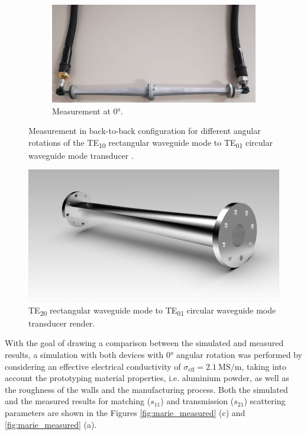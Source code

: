 \documentclass[english,twoside]{article}
\begin{document}
\begin{figure}
    	\begin{subfigure}[b]{0.48\textwidth}
    		\includegraphics[width=\textwidth]{figures/marie_photo_0}
    		\caption{Measurement at $\ang{0}$.}
    	\end{subfigure}
    	\caption{Measurement in back-to-back configuration for different angular rotations of the TE\textsubscript{10} rectangular waveguide mode to TE\textsubscript{01} circular waveguide mode transducer \cite{gonzalez}.}
    	\label{fig:marie_photo}
    \end{figure}

	\begin{figure}
		\centering
		\includegraphics[width=.7\textwidth]{renders/Conversor_Marie_Prodintec_optimizado_stp}
		\caption{TE\textsubscript{20} rectangular waveguide mode to TE\textsubscript{01} circular waveguide mode transducer render.}
	\end{figure}

	With the goal of drawing a comparison between the simulated and measured results, a simulation with both devices with $\ang{0}$ angular rotation was performed by considering an effective electrical conductivity of $\sigma_\mathrm{eff}=\SI{2.1}{\mega\siemens\per\metre}$, taking into account the prototyping material properties, i.e. aluminium powder, as well as the roughness of the walls and the manufacturing process. Both the simulated and the measured results for matching ($s_{11}$) and transmission ($s_{21}$) scattering parameters are shown in the Figures \ref{fig:marie_measured} (c) and \ref{fig:marie_measured} (a).\\
    
\end{document}

